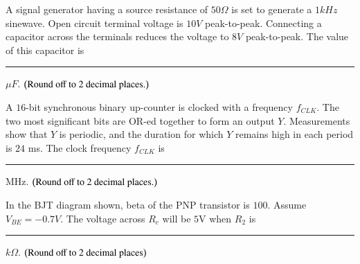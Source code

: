 \documentclass[journal]{IEEEtran}
\begin{document}
\begin{enumerate}
{{\begin{figure}[H]
\label{fig:my_label}
\end{figure}
}
\item{
A signal generator having a source resistance of $50\Omega$ is set to generate a $1kHz$ sinewave. Open circuit terminal voltage is $10V$ peak-to-peak. Connecting a capacitor across the terminals reduces the voltage to $8V$ peak-to-peak. The value of this capacitor is \rule{2cm}{0.15mm}$\mu F$. $\left(\text{Round off to 2 decimal places.}\right)$\\
}
\item{
A $16$-bit synchronous binary up-counter is clocked with a frequency $f_{CLK}$. The two most significant bits are OR-ed together to form an output $Y$. Measurements show that $Y$ is periodic, and the duration for which $Y$ remains high in each period is $24$ ms. The clock frequency $f_{CLK}$ is \rule{2cm}{0.15mm}MHz. $\left(\text{Round off to 2 decimal places.}\right)$\\
}
\item{
In the BJT diagram shown, beta of the PNP transistor is $100$. Assume $V_{BE}=-0.7V$. The voltage across $R_c$ will be $5$V when $R_2$ is \rule{2cm}{0.15mm}$k\Omega$. $\left(\text{Round off to $2$ decimal places}\right)$
\begin{figure}[H]
\centering
{}%


\end{figure}}}
\end{enumerate}
\end{document}
